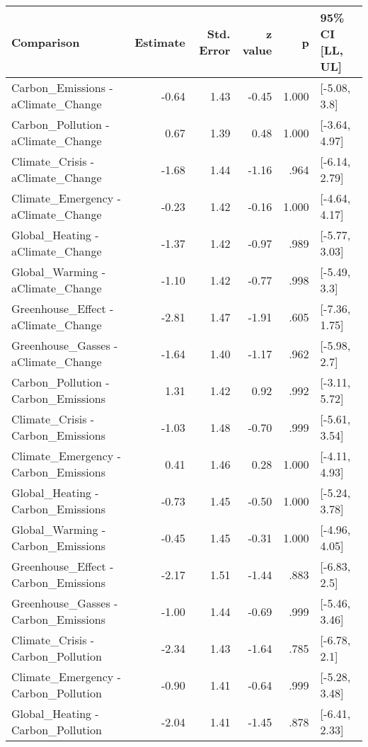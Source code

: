 \begin{table}[ht]
\centering
\begin{tabular}{lrrrrl}
  \hline
Comparison & Estimate & Std. Error & z value & p & 95\% CI [LL, UL] \\ 
  \hline
Carbon\_Emissions - aClimate\_Change & -0.64 & 1.43 & -0.45 & 1.000 & [-5.08, 3.8] \\ 
  Carbon\_Pollution - aClimate\_Change & 0.67 & 1.39 & 0.48 & 1.000 & [-3.64, 4.97] \\ 
  Climate\_Crisis - aClimate\_Change & -1.68 & 1.44 & -1.16 & .964 & [-6.14, 2.79] \\ 
  Climate\_Emergency - aClimate\_Change & -0.23 & 1.42 & -0.16 & 1.000 & [-4.64, 4.17] \\ 
  Global\_Heating - aClimate\_Change & -1.37 & 1.42 & -0.97 & .989 & [-5.77, 3.03] \\ 
  Global\_Warming - aClimate\_Change & -1.10 & 1.42 & -0.77 & .998 & [-5.49, 3.3] \\ 
  Greenhouse\_Effect - aClimate\_Change & -2.81 & 1.47 & -1.91 & .605 & [-7.36, 1.75] \\ 
  Greenhouse\_Gasses - aClimate\_Change & -1.64 & 1.40 & -1.17 & .962 & [-5.98, 2.7] \\ 
  Carbon\_Pollution - Carbon\_Emissions & 1.31 & 1.42 & 0.92 & .992 & [-3.11, 5.72] \\ 
  Climate\_Crisis - Carbon\_Emissions & -1.03 & 1.48 & -0.70 & .999 & [-5.61, 3.54] \\ 
  Climate\_Emergency - Carbon\_Emissions & 0.41 & 1.46 & 0.28 & 1.000 & [-4.11, 4.93] \\ 
  Global\_Heating - Carbon\_Emissions & -0.73 & 1.45 & -0.50 & 1.000 & [-5.24, 3.78] \\ 
  Global\_Warming - Carbon\_Emissions & -0.45 & 1.45 & -0.31 & 1.000 & [-4.96, 4.05] \\ 
  Greenhouse\_Effect - Carbon\_Emissions & -2.17 & 1.51 & -1.44 & .883 & [-6.83, 2.5] \\ 
  Greenhouse\_Gasses - Carbon\_Emissions & -1.00 & 1.44 & -0.69 & .999 & [-5.46, 3.46] \\ 
  Climate\_Crisis - Carbon\_Pollution & -2.34 & 1.43 & -1.64 & .785 & [-6.78, 2.1] \\ 
  Climate\_Emergency - Carbon\_Pollution & -0.90 & 1.41 & -0.64 & .999 & [-5.28, 3.48] \\ 
  Global\_Heating - Carbon\_Pollution & -2.04 & 1.41 & -1.45 & .878 & [-6.41, 2.33] \\ 

\end{tabular}
\end{table}
